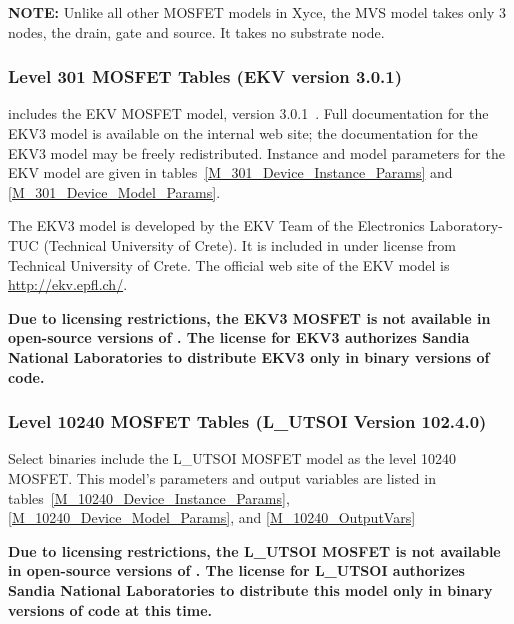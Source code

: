 {\bf NOTE: } Unlike all other MOSFET models in Xyce, the MVS model
takes only 3 nodes, the drain, gate and source.  It takes no substrate
node.




\clearpage
\subsubsection{Level 301 MOSFET Tables (EKV version 3.0.1)}
\Xyce{} includes the EKV MOSFET model, version
3.0.1~\cite{BLETK:1997}\cite{EKV:2006}\cite{EKV:2007}.  Full
documentation for the EKV3 model is available on the \Xyce{} internal web site;
the documentation for the EKV3 model may be freely redistributed.  Instance and
model parameters for the EKV model are given in
tables~\ref{M_301_Device_Instance_Params} and \ref{M_301_Device_Model_Params}.

The EKV3 model is developed by the EKV Team of the Electronics Laboratory-TUC
(Technical University of Crete). It is included in \Xyce{} under license from
Technical University of Crete.  The official web site of the EKV model is
\url{http://ekv.epfl.ch/}.

\textbf{Due to licensing restrictions, the EKV3 MOSFET is not available in
     open-source versions of \Xyce{}.  The license for EKV3 authorizes Sandia
     National Laboratories to distribute EKV3 only in binary versions of code.}





\clearpage
\subsubsection{Level 10240 MOSFET Tables (L\_UTSOI Version 102.4.0)}
Select \Xyce{} binaries include the L\_UTSOI MOSFET model as the level
10240 MOSFET.  This model's parameters and output variables are listed in tables~\ref{M_10240_Device_Instance_Params}, \ref{M_10240_Device_Model_Params}, and \ref{M_10240_OutputVars}





\textbf{Due to licensing restrictions, the L\_UTSOI MOSFET is not
  available in open-source versions of \Xyce{}.  The license for
  L\_UTSOI authorizes Sandia National Laboratories to distribute this
  model only in binary versions of code at this time.}

